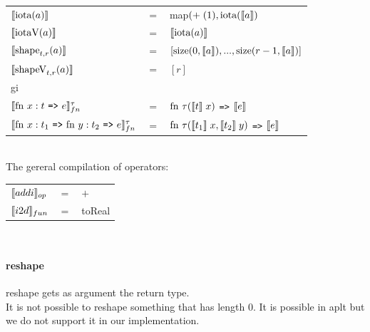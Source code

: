 \documentclass[11pt]{article}
\begin{document}
\begin{tabular}{l c l}

$\llbracket \text{iota}(a) \rrbracket$ & $=$ & map$(+ \; (1), \text{iota}(\llbracket a \rrbracket)$\\

$\llbracket \text{iotaV}(a) \rrbracket$ & $=$ & $\llbracket \text{iota}(a) \rrbracket$\\

$\llbracket \text{shape}_{t,r}(a) \rrbracket$ & $=$ & $[\text{size}(0,\llbracket a \rrbracket),...,\text{size}(r-1,\llbracket a \rrbracket)]$\\

$\llbracket \text{shapeV}_{t,r}(a) \rrbracket$ & $=$ & $[r]$\\
gi
\\
%
%
$\evals{ \text{fn } x:t $ {\tt =>} $ e}^{\tau}_{fn} $ & $=$ & $ \text{fn } \tau (\llbracket t \rrbracket\; x) $ {\tt =>} $ \llbracket e \rrbracket$\\
$\evals{ \text{fn } x:t_1$ {\tt =>} $\text{fn } y:t_2 $ {\tt =>} $ e}^{\tau}_{fn} $ & $=$ & $ \text{fn } \tau (\llbracket t_1 \rrbracket\; x, \llbracket t_2 \rrbracket \; y) $ {\tt =>} $ \llbracket e \rrbracket$\\
\end{tabular}\\

The gereral compilation of operators:\\

\begin{tabular}{l c l}
$\llbracket addi \rrbracket_{op}$ & $=$ & $+$\\
$\llbracket i2d \rrbracket_{fun}$ & $=$ & toReal\\ 
\end{tabular}\\

\paragraph{reshape}
reshape gets as argument the return type.\\
It is not possible to reshape something that has length 0. It is possible in aplt but we do not support it in our implementation. \\
\end{document}
